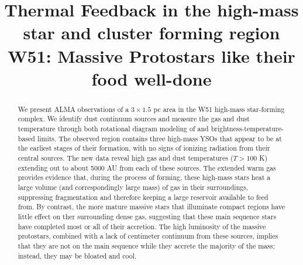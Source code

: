 \documentclass{emulateapj}
\begin{document}
\title{Thermal Feedback in the high-mass star and cluster forming region W51:
       Massive Protostars like their food well-done}


\begin{abstract}
    We present ALMA observations of a $3\times1.5$ pc area in the W51
    high-mass star-forming complex.  We identify dust continuum sources and
    measure the gas and dust temperature through both rotational diagram
    modeling of \methanol and  brightness-temperature-based limits.  The
    observed region contains three high-mass YSOs that appear to be at the
    earliest stages of their formation, with no signs of ionizing radiation
    from their central sources.  The new data reveal  high gas and dust
    temperatures ($T > 100$ K) extending out to about 5000 AU from each of
    these sources.
    The extended warm gas provides evidence that, during the process of
    forming, these high-mass stars heat a large volume (and correspondingly
    large mass) of gas in their surroundings, suppressing fragmentation and
    therefore keeping a large reservoir available to feed from.  By contrast,
    the more mature massive stars that illuminate compact \hii regions have
    little effect on ther surrounding dense gas, suggesting that these main
    sequence stars have completed most or all of their accretion.  
    The high luminosity of the massive protostars, combined with a lack of
    centimeter continuum from these sources, implies that they are not on
    the main sequence while they accrete the majority of the mass; instead,
    they may be bloated and cool.
    


\end{abstract}
\end{document}
